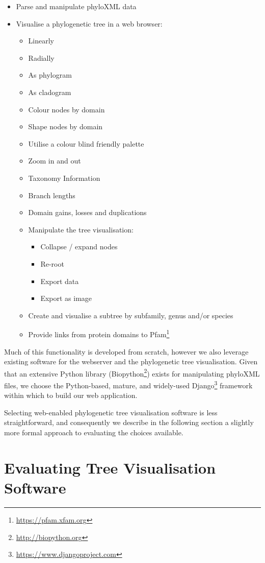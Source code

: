 \documentclass[12pt,a4paper]{article}
\begin{document}
\singlespace
\begin{itemize}
\item Parse and manipulate phyloXML data
\item Visualise a phylogenetic tree in a web browser:
\begin{itemize}
\item Linearly
\item Radially
\item As phylogram
\item As cladogram
\item Colour nodes by domain
\item Shape nodes by domain
\item Utilise a colour blind friendly palette
\item Zoom in and out
\item Taxonomy Information
\item Branch lengths
\item Domain gains, losses and duplications
\item Manipulate the tree visualisation:
\begin{itemize}
\item Collapse / expand nodes
\item Re-root
\item Export data
\item Export as image
\end{itemize}
\item Create and visualise a subtree by subfamily, genus and/or species
\item Provide links from protein domains to Pfam\footnote{\url{https://pfam.xfam.org}}
\end{itemize}
\end{itemize}
\doublespace

Much of this functionality is developed from scratch, however we also leverage existing software for the webserver and the phylogenetic tree visualisation. Given that an extensive Python library (Biopython\footnote{\url{http://biopython.org}}) exists for manipulating phyloXML files, we choose the Python-based, mature, and widely-used Django\footnote{\url{https://www.djangoproject.com}} framework within which to build our web application.

Selecting web-enabled phylogenetic tree visualisation software is less straightforward, and consequently we describe in the following section a slightly more formal approach to evaluating the choices available.

\section{Evaluating Tree Visualisation Software}
\end{document}
